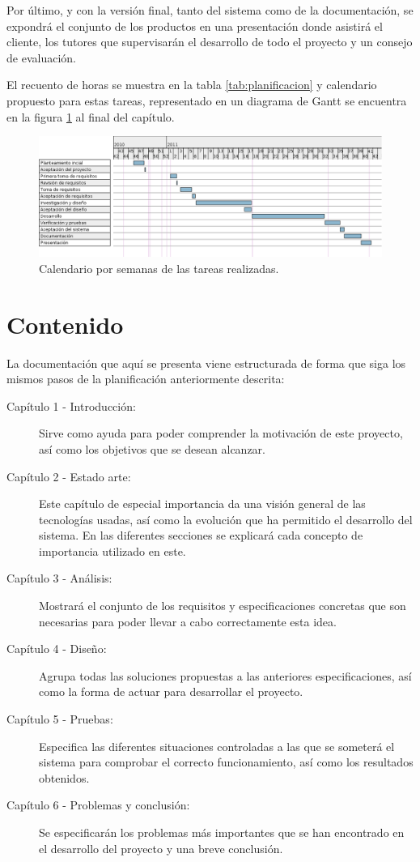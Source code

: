Por último, y con la versión final, tanto del sistema como de la 
documentación, se expondrá el conjunto de los productos en una 
presentación donde asistirá el cliente, los tutores que supervisarán 
el desarrollo de todo el proyecto y un consejo de evaluación.

El recuento de horas se muestra en la tabla \ref{tab:planificacion} y 
calendario propuesto para estas tareas, representado en un diagrama de 
Gantt se encuentra en la figura \ref{fig:calendario} al final del capítulo.

\begin{figure}[h]
	\centering
	\includegraphics[angle=270,scale=0.65]{images/gantt.png}
	\caption[Calendario de tareas]{Calendario por semanas de las 
	tareas realizadas.}
	\label{fig:calendario}
\end{figure}

\section{Contenido}

La documentación que aquí se presenta viene estructurada de forma que 
siga los mismos pasos de la planificación anteriormente descrita:

\begin{description}
\item[Capítulo 1 - Introducción:] Sirve como ayuda para poder 
comprender la motivación de este proyecto, así como los objetivos que 
se desean alcanzar.
\item[Capítulo 2 - Estado arte:] Este capítulo de especial importancia 
da una visión general de las tecnologías usadas, así como la 
evolución que ha permitido el desarrollo del sistema. En las 
diferentes secciones se explicará cada concepto de importancia 
utilizado en este.
\item[Capítulo 3 - Análisis:] Mostrará el conjunto de los requisitos y 
especificaciones concretas que son necesarias para poder llevar a cabo 
correctamente esta idea.
\item[Capítulo 4 - Diseño:] Agrupa todas las soluciones propuestas a 
las anteriores especificaciones, así como la forma de actuar para 
desarrollar el proyecto.
\item[Capítulo 5 - Pruebas:] Especifica las diferentes situaciones 
controladas a las que se someterá el sistema para comprobar el 
correcto funcionamiento, así como los resultados obtenidos.
\item[Capítulo 6 - Problemas y conclusión:] Se especificarán los 
problemas más importantes que se han encontrado en el desarrollo del 
proyecto y una breve conclusión.
\end{description}

